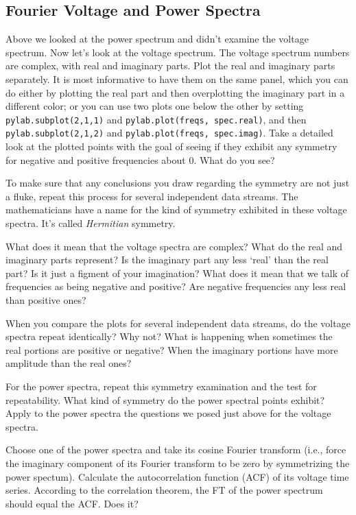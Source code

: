 \documentclass[12pt,preprint]{aastex}
\begin{document}
\subsection{Fourier Voltage and Power Spectra}

Above we looked
at the power spectrum and didn't examine the voltage spectrum. Now let's
look at the voltage spectrum. The voltage spectrum numbers are complex,
with real and imaginary parts. Plot the real and imaginary parts
separately. It is most informative to have them on the same panel, which
you can do either by plotting the real part and then overplotting the
imaginary part in a different color; or you can use two plots one below
the other by setting {\tt pylab.subplot(2,1,1)} and {\tt pylab.plot(freqs, spec.real)},
  and then {\tt pylab.subplot(2,1,2)} and {\tt pylab.plot(freqs, spec.imag)}.
 Take a detailed look at the plotted points with the
goal of seeing if they exhibit any symmetry for negative and positive
frequencies about 0. What do you see?

To make sure that any conclusions you draw regarding the symmetry are
not just a fluke, repeat this process for several independent data
streams.  The mathematicians have a name for the kind of symmetry
exhibited in these voltage spectra. It's called {\it Hermitian} symmetry.

What does it mean that the voltage spectra are complex? What do the real
and imaginary parts represent? Is the imaginary part any less `real'
than the real part? Is it just a figment of your imagination?
What does it mean that we talk of frequencies as being negative and
positive? Are negative frequencies any less real than positive ones?

When you compare the plots for several independent data streams, do the
voltage spectra repeat identically?  Why not? What is happening when
sometimes the real portions are positive or negative? When the imaginary
portions have more amplitude than the real ones?

For the power spectra, repeat this symmetry examination and the test for
repeatability. What kind of symmetry do the power spectral points
exhibit? Apply to the power spectra the questions we posed just above
for the voltage spectra.

Choose one of the power spectra and take its cosine Fourier transform
(i.e., force the imaginary component of its Fourier transform to be zero
by symmetrizing the power spectum). Calculate the autocorrelation function
(ACF) of its voltage time series. According to the correlation theorem, the FT
of the power spectrum should equal the ACF. Does it? 
\end{document}
